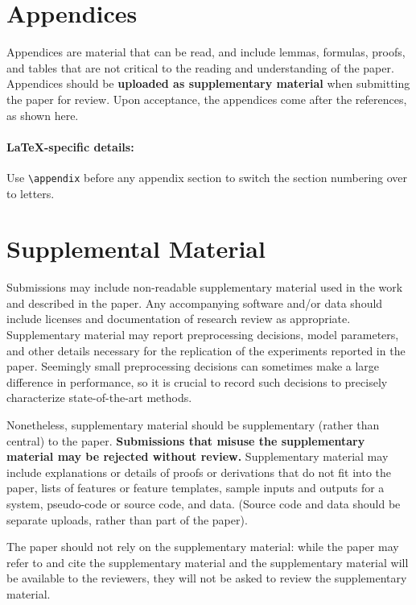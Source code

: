 \documentclass[10pt,twocolumn,letterpaper]{article}
\begin{document}
\section{Appendices}
\label{sec:appendix}
Appendices are material that can be read, and include lemmas, formulas, proofs, and tables that are not critical to the reading and understanding of the paper. 
Appendices should be \textbf{uploaded as supplementary material} when submitting the paper for review.
Upon acceptance, the appendices come after the references, as shown here.

\paragraph{\LaTeX-specific details:}
Use {\small\verb|\appendix|} before any appendix section to switch the section numbering over to letters.


\section{Supplemental Material}
\label{sec:supplemental}
Submissions may include\cite{GeoTran}\cite{CenterLoss}\cite{BucciROS}\cite{OldROS}\cite{CarlucciJigsaw} non-readable supplementary material used in the work and described in the paper.
Any accompanying software and/or data should include licenses and documentation of research review as appropriate.
Supplementary material may report preprocessing decisions, model parameters, and other details necessary for the replication of the experiments reported in the paper.
Seemingly small preprocessing decisions can sometimes make a large difference in performance, so it is crucial to record such decisions to precisely characterize state-of-the-art methods. 

Nonetheless, supplementary material should be supplementary (rather than central) to the paper.
\textbf{Submissions that misuse the supplementary material may be rejected without review.}
Supplementary material may include explanations or details of proofs or derivations that do not fit into the paper, lists of
features or feature templates, sample inputs and outputs for a system, pseudo-code or source code, and data.
(Source code and data should be separate uploads, rather than part of the paper).

The paper should not rely on the supplementary material: while the paper may refer to and cite the supplementary material and the supplementary material will be available to the reviewers, they will not be asked to review the supplementary material.

{\small


}
\end{document}
